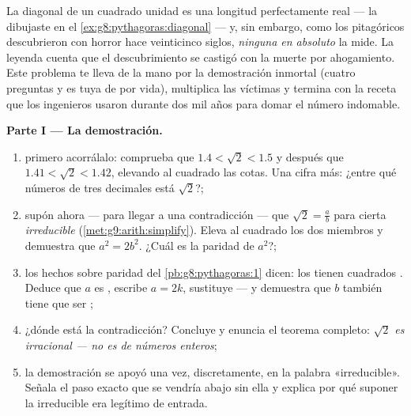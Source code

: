 \begin{problem}
\label{pb:g9:sqrt:1}
La diagonal de un cuadrado unidad es una longitud perfectamente real --- la
dibujaste en el \cref{ex:g8:pythagoras:diagonal} --- y, sin embargo, como
los pitagóricos descubrieron con horror hace veinticinco
siglos, \emph{ninguna  en absoluto} la mide. La leyenda
cuenta que el descubrimiento se castigó con la muerte por ahogamiento. Este problema te lleva
de la mano por la demostración inmortal (cuatro preguntas y es tuya
de por vida), multiplica las víctimas y termina con la receta
que los ingenieros usaron durante dos mil años para domar el número
indomable.

\medskip
\noindent\textbf{Parte I --- La demostración.}
\begin{enumerate}
  \item primero acorrálalo: comprueba que
        $1.4 < \sqrt2 < 1.5$ y después que $1.41 < \sqrt2 < 1.42$,
        elevando al cuadrado las cotas. Una cifra más: ¿entre qué
        números de tres decimales está $\sqrt2$?;
  \item supón ahora --- para llegar a una contradicción --- que
        $\sqrt2 = \frac ab$ para cierta  \emph{irreducible}
        (\cref{met:g9:arith:simplify}). Eleva al cuadrado los dos miembros
        y demuestra que $a^2 = 2 b^2$. ¿Cuál es la paridad de
        $a^2$?;
  \item los hechos sobre paridad del \cref{pb:g8:pythagoras:1} dicen: los  tienen cuadrados . Deduce que $a$ es , escribe
        $a = 2k$, sustituye --- y demuestra que $b$ también tiene que ser
        ;
  \item ¿dónde está la contradicción? Concluye y enuncia el
        teorema completo: \emph{$\sqrt2$ es irracional --- no es
         de números enteros};
  \item la demostración se apoyó una vez, discretamente, en la palabra
        «irreducible». Señala el paso exacto que se
        vendría abajo sin ella y explica por qué suponer la 
        irreducible era legítimo de entrada.
\end{enumerate}


\end{problem}
